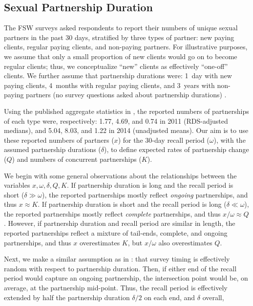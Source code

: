 \subsection{Sexual Partnership Duration}\label{meth.partners}
The FSW surveys asked respondents to report
their numbers of unique sexual partners in the past 30 days,
stratified by three types of partner:
new paying clients, regular paying clients, and non-paying partners.
For illustrative purposes, we assume that
only a small proportion of new clients would go on to become regular clients;
thus, we conceptualize ``new'' clients as effectively ``one-off'' clients.
We further assume that partnership durations were:
1~day with new paying clients,
4~months with regular paying clients, and
3~years with non-paying partners 
(no survey questions asked about partnership durations) \cite{?}.
\par
Using the published aggregate statistics in \cite{Baral2014,EswKP2014},
the reported numbers of partnerships of each type were, respectively:
1.77, 4.69, and 0.74 in 2011 (RDS-adjusted medians), and
5.04, 8.03, and 1.22 in 2014 (unadjusted means).
Our aim is to use these reported numbers of partners ($x$)
for the 30-day recall period ($\omega$),
with the assumed partnership durations ($\delta$),
to define expected rates of partnership change ($Q$) and numbers of concurrent partnerships ($K$).
\par
We begin with some general observations about
the relationships between the variables $x, \omega, \delta, Q, K$.
If partnership duration is long and the recall period is short ($\delta \gg \omega$),
the reported partnerships mostly reflect \emph{ongoing} partnerships,
and thus $x \approx K$.
If partnership duration is short and the recall period is long ($\delta \ll \omega$),
the reported partnerships mostly reflect \emph{complete} partnerships,
and thus $x/\omega \approx Q$.
However, if partnership duration and recall period are similar in length,
the reported partnerships reflect a mixture of tail-ends, complete, and ongoing partnerships,
and thus $x$ overestimates $K$, but $x/\omega$ also overestimates $Q$.
\par
Next, we make a similar assumption as in :
that survey timing is effectively random with respect to partnership duration.
Then, if either end of the recall period would capture an ongoing partnership,
the intersection point would be, on average, at the partnership mid-point.
Thus, the recall period is effectively extended
by half the partnership duration $\delta/2$ on each end, and $\delta$ overall,
